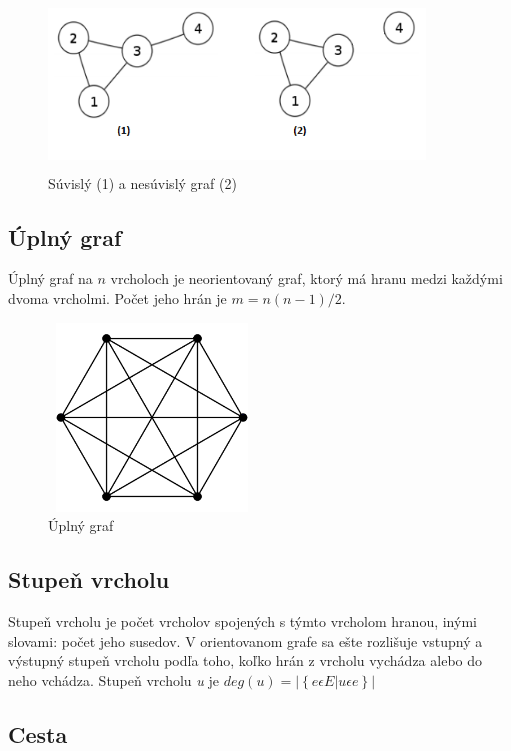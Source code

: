 \documentclass[slovak,master,public,dept460,male,cpdeclaration,oneside]{diploma}
\begin{document}
\begin{figure}[H]
\centering
\includegraphics[width=10cm,height=4.5cm]{figures/suvisly_vs_nesuvisly}
\caption{Súvislý (1) a nesúvislý graf (2)}
\end{figure}


\subsection{Úplný graf}

Úplný graf na ${n}$ vrcholoch je neorientovaný graf, ktorý má hranu medzi každými dvoma vrcholmi. Počet jeho hrán je ${m = n ( n - 1) / 2}$.

\begin{figure}[H]
\centering
\includegraphics[width=5.5cm,height=5cm]{figures/uplnygraf}
\caption{Úplný graf}
\end{figure}


\subsection{Stupeň vrcholu}

Stupeň vrcholu je počet vrcholov spojených s týmto vrcholom hranou, inými slovami: počet jeho susedov. V orientovanom grafe sa ešte rozlišuje vstupný a výstupný stupeň vrcholu podľa toho, koľko hrán z vrcholu vychádza alebo do neho vchádza. Stupeň vrcholu \textit{u} je ${deg(u) = \left |\left \{ e  \epsilon E | u \epsilon e   \right \} \right |}$


\subsection{Cesta}
\end{document}
